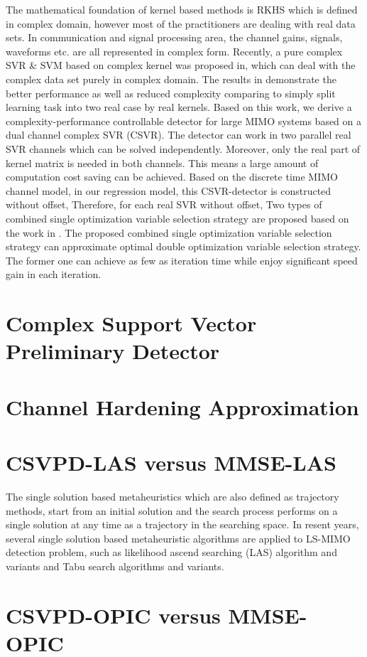 The mathematical foundation of kernel based methods is RKHS which is defined in complex domain, however most of the practitioners are dealing with real data sets. In communication and signal processing area, the channel gains, signals, waveforms etc. are all represented in complex form. Recently, a pure complex SVR \& SVM based on complex kernel was proposed in\cite{bouboulis2013complex}, which can deal with the complex data set purely in complex domain. The results in\cite{bouboulis2013complex} demonstrate the better performance as well as reduced complexity comparing to simply split learning task into two real case by real kernels.  
Based on this work, we derive a complexity-performance controllable detector for large MIMO systems based on a dual channel complex SVR (CSVR). The detector can work in two parallel real SVR channels which can be solved independently. Moreover, only the real part of kernel matrix is needed in both channels. This means a large amount of computation cost saving can be achieved.
Based on the discrete time MIMO channel model, in our regression model, this CSVR-detector
is constructed without offset, Therefore, for each real SVR without offset, 
Two types of combined single optimization variable selection strategy are proposed based on the work in \cite{steinwart2011training}. The proposed combined single optimization variable selection strategy can approximate optimal double optimization variable selection strategy. The former one can achieve as few as iteration time while enjoy significant speed gain in each iteration.
\section{Complex Support Vector Preliminary Detector}
\section{Channel Hardening Approximation}
\section{CSVPD-LAS versus MMSE-LAS}
The single solution based metaheuristics which are also defined as trajectory methods, start from an initial solution and the search process performs on a single solution at any time as a trajectory in the searching space. In resent years, several single solution based metaheuristic algorithms are applied to LS-MIMO detection problem, such as likelihood ascend searching (LAS) algorithm and variants\cite{vardhan2008low}\cite{cerato2009hardware}\cite{li2010multiple} and Tabu search algorithms and variants\cite{srinidhi2011layered}\cite{datta2010random}. 
\section{CSVPD-OPIC versus MMSE-OPIC}
